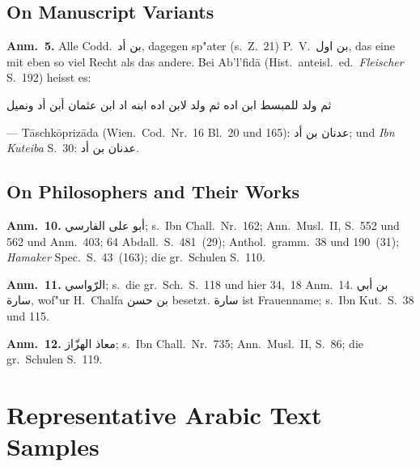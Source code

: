 \documentclass[11pt,a4paper]{article}
\newcommand{\ar}[1]{{\arabicfont\beginR #1\endR}}
\newenvironment{german}{\germanfont}{}
\newenvironment{arabicblock}{%
  \par\vspace{0.5em}%
  \begin{center}%
  \begin{minipage}{0.9\textwidth}%
  \setlength{\parskip}{0pt}%
  \setlength{\parindent}{0pt}%
}{%
  \end{minipage}%
  \end{center}%
  \vspace{0.5em}%
}
\begin{document}
\subsection{On Manuscript Variants}

\begin{german}

\textbf{Anm.~5.} Alle Codd.\ \ar{بن أد}, dagegen sp"ater (s.~Z.~21)
P.~V.\ \ar{بن اول}, das eine mit eben so viel Recht als das andere.
Bei Ab'l'fid\=a (Hist.\ anteisl.\ ed.\ \textit{Fleischer} S.~192) heisst es:

\begin{arabicblock}
\ar{ثم ولد للمبسط ابن اده ثم ولد لابن اده ابنه اد ابن عثمان أبن أد ونميل}
\end{arabicblock}

--- T\=aschk\=opriz\=ada (Wien.\ Cod.\ Nr.~16 Bl.~20 und 165):
\ar{عدنان بن أد}; und \textit{Ibn Kuteiba} S.~30: \ar{عدنان بن أد}.

\end{german}

\subsection{On Philosophers and Their Works}

\begin{german}

\textbf{Anm.~10.} \ar{أبو على الفارسي}; s.~Ibn Chall.\ Nr.~162;
Ann.\ Musl.\ II, S.~552 und 562 und Anm.~403; 64 Abdall.\ S.~481~(29);
Anthol.\ gramm.\ 38 und 190~(31); \textit{Hamaker} Spec.\ S.~43~(163);
die gr.\ Schulen S.~110.

\smallskip

\textbf{Anm.~11.} \ar{الرّواسي}; s.\ die gr.\ Sch.\ S.~118 und hier
34,~18 Anm.~14. \ar{بن أبي سارة}, wof"ur H.\ Chalfa \ar{بن حسن}
besetzt. \ar{سارة} ist Frauenname; s.\ Ibn Kut.\ S.~38 und 115.

\smallskip

\textbf{Anm.~12.} \ar{معاذ الهزّاز}; s.\ Ibn Chall.\ Nr.~735;
Ann.\ Musl.\ II, S.~86; die gr.\ Schulen S.~119.

\end{german}

\newpage

\section{Representative Arabic Text Samples}
\end{document}
